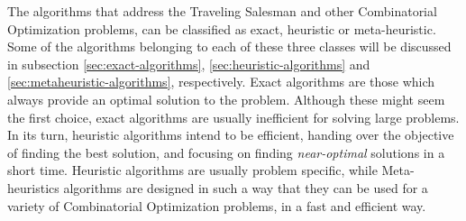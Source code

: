 The algorithms that address the Traveling Salesman and other Combinatorial Optimization problems, can be classified as exact, heuristic or meta-heuristic. Some of the algorithms belonging to each of these three classes will be discussed in subsection \ref{sec:exact-algorithms}, \ref{sec:heuristic-algorithms} and \ref{sec:metaheuristic-algorithms}, respectively. Exact algorithms are those which always provide an optimal solution to the problem. Although these might seem the first choice, exact algorithms are usually inefficient for solving large problems. In its turn, heuristic algorithms intend to be efficient, handing over the objective of finding the best solution, and focusing on finding \textit{near-optimal} solutions in a short time. Heuristic algorithms are usually problem specific, while Meta-heuristics algorithms are designed in such a way that they can be used for a variety of Combinatorial Optimization problems, in a fast and efficient way.



